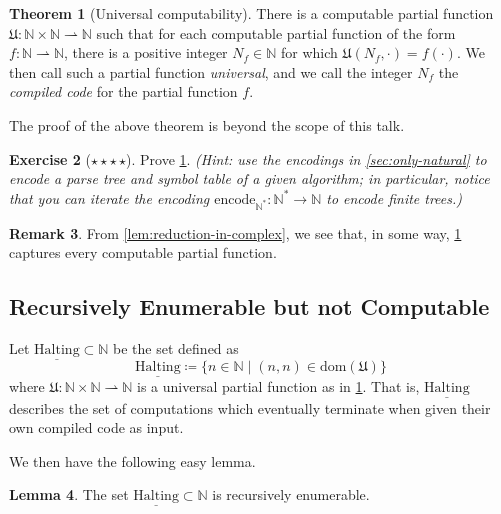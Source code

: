 \documentclass[11pt,a4paper,reqno]{amsart}
\theoremstyle{plain}
\theoremstyle{definition}
\newtheorem{theorem}{Theorem}[section]
\newtheorem{lemma}[theorem]{Lemma}
\theoremstyle{definition}
\newtheorem{exercise}[theorem]{Exercise}
\newtheorem{remark}[theorem]{Remark}
\newcommand\exerciseLevelVeryHard{$\star${\,}$\star${\,}$\star${\,}$\star$}
\begin{document}
\begin{theorem}[Universal computability]\label{thm:universality}
	There is a computable partial function $\mathfrak U\colon \mathbb N\times \mathbb N \rightharpoonup \mathbb N$ such that for each computable partial function of the form $f\colon \mathbb N \rightharpoonup \mathbb N$, there is a positive integer $N_f\in \mathbb N$ for which $\mathfrak U(N_f, \cdot) = f(\cdot)$.
  We then call such a partial function \emph{universal}, and we call the integer $N_f$ the \emph{compiled code} for the partial function $f$.
\end{theorem}

The proof of the above theorem is beyond the scope of this talk.

\begin{exercise}[\exerciseLevelVeryHard]
  Prove \cref{thm:universality}. \textit{(Hint: use the encodings in \cref{sec:only-natural} to encode a parse tree and symbol table of a given algorithm; in particular, notice that you can iterate the encoding $\mathrm{encode}_{\mathbb N^*}\colon \mathbb N^*\to\mathbb N$ to encode finite trees.)}
\end{exercise}

\smallskip

\begin{remark}
  From \cref{lem:reduction-in-complex}, we see that, in some way, \cref{thm:universality} captures every computable partial function.
\end{remark}

\subsection{Recursively Enumerable but not Computable}\label{sec:re-not-comp}

Let $\underline{\mathrm{Halting}}\subset \mathbb N$ be the set defined as
\[
  \underline{\mathrm{Halting}}
  \coloneqq
  \{
    n\in \mathbb N \mid (n,n)\in \mathrm{dom}(\mathfrak U)
  \}
\]
where $\mathfrak U\colon \mathbb N \times \mathbb N\rightharpoonup \mathbb N$ is a universal partial function as in \cref{thm:universality}.
That is, $\underline{\mathrm{Halting}}$ describes the set of computations which eventually terminate when given their own compiled code as input.

We then have the following easy lemma.

\begin{lemma}\label{lem:Halt-is-re}
  The set $\underline{\mathrm{Halting}}\subset \mathbb N$ is recursively enumerable.
\end{lemma}
\end{document}

